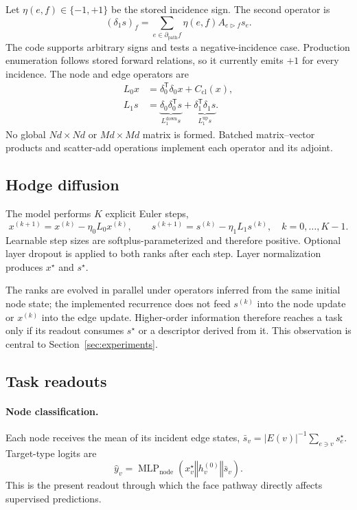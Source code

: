 \documentclass{article}
\newcommand{\transpose}{\mathsf{T}}
\newcommand{\concat}{\mathbin\Vert}
\begin{document}
Let $\eta(e,f)\in\{-1,+1\}$ be the stored incidence sign. The second operator is
\begin{equation}
  (\delta_1s)_f=\sum_{e\in\partial_{\mathrm{path}} f}
  \eta(e,f)A_{e\triangleright f}s_e.
  \label{eq:delta1}
\end{equation}
The code supports arbitrary signs and tests a negative-incidence case. Production enumeration
follows stored forward relations, so it currently emits $+1$ for every incidence. The node and
edge operators are
\begin{align}
  L_0x &= \delta_0^{\transpose}\delta_0x+C_{\mathrm{cl}}(x),
  \label{eq:l0}\\
  L_1s &= \underbrace{\delta_0\delta_0^{\transpose}s}_{L_1^{\mathrm{down}}s}
         +\underbrace{\delta_1^{\transpose}\delta_1s}_{L_1^{\mathrm{up}}s}.
  \label{eq:l1}
\end{align}
No global $Nd\times Nd$ or $Md\times Md$ matrix is formed. Batched matrix--vector products and
scatter-add operations implement each operator and its adjoint.

\subsection{Hodge diffusion}

The model performs $K$ explicit Euler steps,
\begin{equation}
  x^{(k+1)}=x^{(k)}-\eta_0L_0x^{(k)},\qquad
  s^{(k+1)}=s^{(k)}-\eta_1L_1s^{(k)},\quad k=0,\ldots,K-1.
  \label{eq:diffusion}
\end{equation}
Learnable step sizes are softplus-parameterized and therefore positive. Optional layer dropout is
applied to both ranks after each step. Layer normalization produces $x^\star$ and $s^\star$.

The ranks are evolved in parallel under operators inferred from the same initial node state; the
implemented recurrence does not feed $s^{(k)}$ into the node update or $x^{(k)}$ into the edge
update. Higher-order information therefore reaches a task only if its readout consumes $s^\star$
or a descriptor derived from it. This observation is central to Section~\ref{sec:experiments}.

\subsection{Task readouts}
\label{sec:readouts}

\paragraph{Node classification.}
Each node receives the mean of its incident edge states,
$\bar{s}_v=|E(v)|^{-1}\sum_{e\ni v}s_e^\star$. Target-type logits are
\begin{equation}
  \widehat{y}_v=\operatorname{MLP}_{\mathrm{node}}
  (x_v^\star\concat h_v^{(0)}\concat\bar{s}_v).
  \label{eq:node-readout}
\end{equation}
This is the present readout through which the face pathway directly affects supervised predictions.
\end{document}
